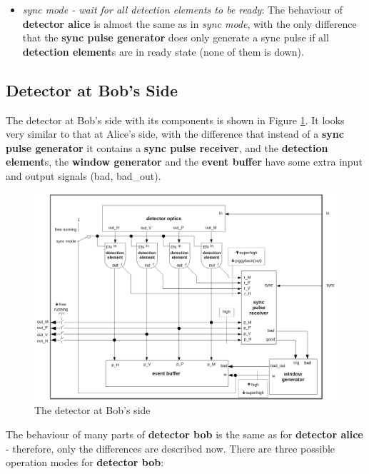 \begin{itemize}
\item \textit{sync mode - wait for all detection elements to be ready}: The behaviour of \textbf{detector alice} is almost the same as in \textit{sync mode}, with the only difference that the \textbf{sync pulse generator} does only generate a sync pulse if all \textbf{detection element}s are in ready state (none of them is down).

\end{itemize}

\subsection{Detector at Bob's Side}
\label{subsec:outline_detector_bob}

The detector at Bob's side with its components is shown in Figure \ref{fig:outline_detector_bob}. It looks very similar to that at Alice's side, with the difference that instead of a \textbf{sync pulse generator} it contains a \textbf{sync pulse receiver}, and the \textbf{detection element}s, the \textbf{window generator} and the \textbf{event buffer} have some extra input and output signals (bad, bad\_out).

\begin{figure}[h]
\centering
\includegraphics[scale=0.65]{drawings/detector_bob.pdf}
\caption{The detector at Bob's side}
\label{fig:outline_detector_bob}
\end{figure}

The behaviour of many parts of \textbf{detector bob} is the same as for \textbf{detector alice} - therefore, only the differences are described now. There are three possible operation modes for \textbf{detector bob}:

